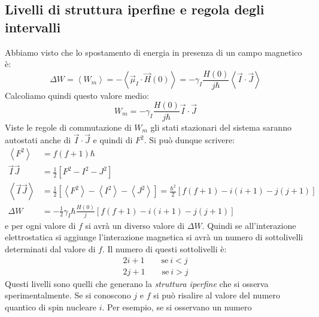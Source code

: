 \subsection{Livelli di struttura iperfine e regola degli intervalli}
Abbiamo  visto che lo spostamento di energia in presenza
di un campo magnetico è:
\begin{equation}
\Delta W = \left \langle W_m \right \rangle = -\left \langle \vec{\mu}_I \cdot \vec{H}{(0)} \right \rangle = -\gamma_I \frac{H{(0)}}{j \hbar} \left \langle \vec{I} \cdot \vec{J} \right \rangle
\end{equation}
Calcoliamo quindi questo valore medio:
\begin{equation}
W_m =  -\gamma_I \frac{H{(0)}}{j \hbar} \vec{I} \cdot \vec{J}
\end{equation}
Viste le regole di commutazione di $W_m$ gli stati stazionari del sistema
saranno autostati anche di $\vec{I}\cdot\vec{J}$ e quindi di $F^2$.
Si può dunque scrivere:
\begin{equation}\begin{split}
\left \langle F^2 \right \rangle &= f (f+1) \hbar\\
\vec{I}\vec{J} &= \frac{1}{2}\left [ F^2 - I^2 - J^2 \right ]\\
\left \langle \vec{I} \vec{J} \right \rangle &= \frac{1}{2} \left [ \left
\langle F^2 \right \rangle - \left \langle I^2 \right \rangle - \left \langle
J^2 \right \rangle \right ] = \frac{\hbar^2}{2} \left [ f(f+1) - i(i+1) - j(j+1)
\right ]\\
\Delta W &= -\frac{1}{2} \gamma_I \hbar \frac{H{(0)}}{j} \left [ f(f+1) - i(i+1)
- j(j+1) \right ]
\end{split}\end{equation}
e per ogni valore di $f$ si avrà un diverso valore di $\Delta W$. Quindi se
all'interazione elettrostatica si aggiunge l'interazione magnetica si avrà un
numero di sottolivelli determinati dal valore di $f$. Il numero di questi
sottolivelli è:
\begin{equation}\begin{split}
2i + 1 \qquad \text{se}\ i<j\\
2j + 1 \qquad \text{se}\ i>j
\end{split}\end{equation}
Questi livelli sono quelli che generano la \textit{struttura iperfine} che si
osserva sperimentalmente. Se si conoscono $j$ e $f$ si può risalire al valore
del numero quantico di spin nucleare $i$. Per esempio, se si osservano un numero
